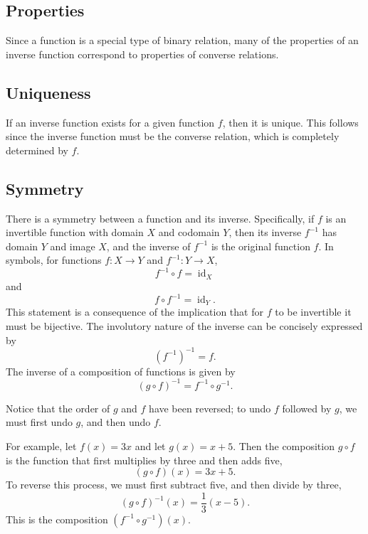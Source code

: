 \subsection{Properties}
\label{sss:prop-7469}

Since a function is a special type of binary relation, many of the properties of an
inverse function correspond to properties of converse relations.

\subsection{Uniqueness}
\label{sss:uniq-754c}

If an inverse function exists for a given function $f$, then it is unique. This follows since the inverse function must be the converse relation, which is completely determined by $f$.

\subsection{Symmetry}
\label{sss:symm-40e7}

There is a symmetry between a function and its inverse. Specifically, if $f$ is an invertible function with domain $X$ and codomain $Y$, then its inverse $f^{-1}$ has domain $Y$ and image $X$, and the inverse of $f^{-1}$ is the original function $f$. In symbols, for functions $f: X \to Y$ and $f^{-1}: Y \to X$,
\[
f^{-1} \circ f = \operatorname{id}_X
\]
and
\[
f \circ f^{-1} = \operatorname{id}_Y.
\]
This statement is a consequence of the implication that for $f$ to be invertible it must be bijective. The involutory nature of the inverse can be concisely expressed by
\[
\left(f^{-1}\right)^{-1} = f.
\]
The inverse of a composition of functions is given by
\[
(g \circ f)^{-1} = f^{-1} \circ g^{-1}.
\]

Notice that the order of $g$ and $f$ have been reversed; to undo $f$ followed by $g$, we must first undo $g$, and then undo $f$.

For example, let $f(x) = 3x$ and let $g(x) = x + 5$. Then the composition $g \circ f$ is the function that first multiplies by three and then adds five,
\[
(g \circ f)(x) = 3x + 5.
\]
To reverse this process, we must first subtract five, and then divide by three,
\[
(g \circ f)^{-1}(x) = \frac{1}{3}(x - 5).
\]
This is the composition $(f^{-1} \circ g^{-1})(x)$.

